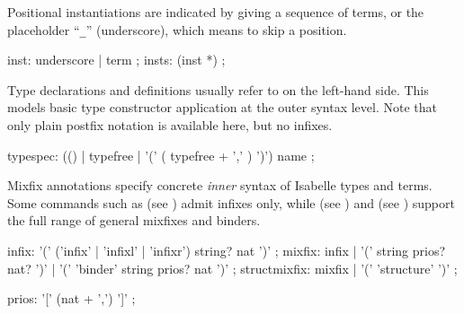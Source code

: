 \begin{isabellebody}
\begin{isamarkuptext}
  Positional instantiations are indicated by giving a sequence of
  terms, or the placeholder ``\verb|_|'' (underscore), which
  means to skip a position.

  \begin{rail}
    inst: underscore | term
    ;
    insts: (inst *)
    ;
  \end{rail}

  Type declarations and definitions usually refer to
   on the left-hand side.  This models basic
  type constructor application at the outer syntax level.  Note that
  only plain postfix notation is available here, but no infixes.

  \begin{rail}
    typespec: (() | typefree | '(' ( typefree + ',' ) ')') name
    ;
  \end{rail}%
\end{isamarkuptext}%
\isamarkuptrue%
%
\isamarkuptrue%
%
\begin{isamarkuptext}%
Mixfix annotations specify concrete \emph{inner} syntax of Isabelle
  types and terms.  Some commands such as  (see
  ) admit infixes only, while  (see ) and  (see
  ) support the full range of general mixfixes
  and binders.

  \begin{rail}
    infix: '(' ('infix' | 'infixl' | 'infixr') string? nat ')'
    ;
    mixfix: infix | '(' string prios? nat? ')' | '(' 'binder' string prios? nat ')'
    ;
    structmixfix: mixfix | '(' 'structure' ')'
    ;

    prios: '[' (nat + ',') ']'
    ;
  \end{rail}


\end{isamarkuptext}
\end{isabellebody}
